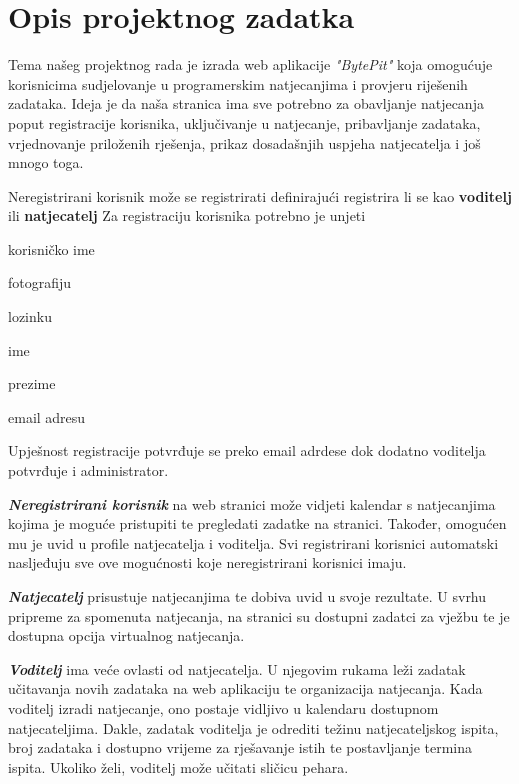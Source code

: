\chapter{Opis projektnog zadatka}
		
		
		
		Tema našeg projektnog rada je izrada web aplikacije \textit{"BytePit"} koja omogućuje korisnicima sudjelovanje u programerskim natjecanjima i provjeru riješenih zadataka. Ideja je da naša stranica ima sve potrebno za obavljanje natjecanja poput registracije korisnika, uključivanje u natjecanje, pribavljanje zadataka, vrjednovanje priloženih rješenja, prikaz dosadašnjih uspjeha natjecatelja i još mnogo toga.
	
		Neregistrirani korisnik može se registrirati definirajući registrira li se kao \textbf{voditelj} ili \textbf{natjecatelj}
		Za registraciju korisnika potrebno je  unjeti \begin{packed_item}
			\item korisničko ime
			\item fotografiju
			\item lozinku
			\item ime
			\item prezime
			\item email adresu
		\end{packed_item}
		Upješnost registracije potvrđuje se preko email adrdese dok dodatno voditelja potvrđuje i administrator.
		
		\textbf{\textit{Neregistrirani korisnik}} na web stranici može vidjeti kalendar s natjecanjima kojima je moguće pristupiti te pregledati zadatke na stranici. Također, omogućen mu je uvid u profile natjecatelja i voditelja. Svi registrirani korisnici automatski nasljeđuju sve ove mogućnosti koje neregistrirani korisnici imaju.
		
	    \textbf{\textit{Natjecatelj}} prisustuje natjecanjima te dobiva uvid u svoje rezultate. U svrhu pripreme za spomenuta natjecanja, na stranici su dostupni zadatci za vježbu te je dostupna opcija virtualnog natjecanja.
	    
	    \textbf{\textit{Voditelj}} ima veće ovlasti od natjecatelja. U njegovim rukama leži zadatak učitavanja novih zadataka na web aplikaciju te organizacija natjecanja. Kada voditelj izradi natjecanje, ono postaje vidljivo u kalendaru dostupnom natjecateljima. Dakle, zadatak voditelja je odrediti težinu natjecateljskog ispita, broj zadataka i dostupno vrijeme za rješavanje istih te postavljanje termina ispita. Ukoliko želi, voditelj može učitati sličicu pehara.  
	    
